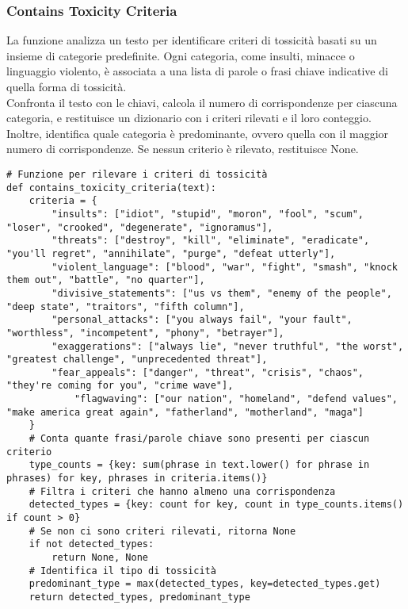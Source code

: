 \documentclass[12pt]{article}
\begin{document}
		\subsubsection{Contains Toxicity Criteria}

La funzione analizza un testo per identificare criteri di tossicità basati su un insieme di categorie predefinite. Ogni categoria, come insulti, minacce o linguaggio violento, è associata a una lista di parole o frasi chiave indicative di quella forma di tossicità.\\
Confronta il testo con le chiavi, calcola il numero di corrispondenze per ciascuna categoria, e restituisce un dizionario con i criteri rilevati e il loro conteggio. Inoltre, identifica quale categoria è predominante, ovvero quella con il maggior numero di corrispondenze. Se nessun criterio è rilevato, restituisce None.
	\begin{lstlisting}
# Funzione per rilevare i criteri di tossicità
def contains_toxicity_criteria(text):
	criteria = {
		"insults": ["idiot", "stupid", "moron", "fool", "scum", "loser", "crooked", "degenerate", "ignoramus"],
		"threats": ["destroy", "kill", "eliminate", "eradicate", "you'll regret", "annihilate", "purge", "defeat utterly"],
		"violent_language": ["blood", "war", "fight", "smash", "knock them out", "battle", "no quarter"],
		"divisive_statements": ["us vs them", "enemy of the people", "deep state", "traitors", "fifth column"],
		"personal_attacks": ["you always fail", "your fault", "worthless", "incompetent", "phony", "betrayer"],
		"exaggerations": ["always lie", "never truthful", "the worst", "greatest challenge", "unprecedented threat"],
		"fear_appeals": ["danger", "threat", "crisis", "chaos", "they're coming for you", "crime wave"],
			"flagwaving": ["our nation", "homeland", "defend values", "make america great again", "fatherland", "motherland", "maga"]
	}
	# Conta quante frasi/parole chiave sono presenti per ciascun criterio
	type_counts = {key: sum(phrase in text.lower() for phrase in phrases) for key, phrases in criteria.items()}
	# Filtra i criteri che hanno almeno una corrispondenza
	detected_types = {key: count for key, count in type_counts.items() if count > 0}
	# Se non ci sono criteri rilevati, ritorna None
	if not detected_types:
		return None, None
	# Identifica il tipo di tossicità
	predominant_type = max(detected_types, key=detected_types.get)
	return detected_types, predominant_type
	\end{lstlisting}
	
\end{document}
